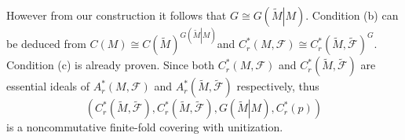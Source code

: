 \documentclass{beamer}
\theoremstyle{plain}
\newcommand{\sF}{\mathcal{F}}       %
\begin{document}
\begin{frame}
	However from our construction it follows that $G \cong G\left(\left.\widetilde M\right| M\right)$.
Condition (b) can be deduced from $C\left(M\right)\cong C\left(\widetilde M\right)^{G\left(\left.\widetilde M\right| M\right)}$and $C^*_r\left( M, {\sF}\right) \cong C^*_r \left(\widetilde M, \widetilde{\sF}\right)^G$. Condition (c) is already proven. Since both $C^*_r\left( M, {\sF}\right)$  and $C^*_r \left(\widetilde M, \widetilde{\sF}\right)$ are essential ideals of $A^*_r\left( M, {\sF}\right)$  and $A^*_r \left(\widetilde M, \widetilde{\sF}\right)$ respectively, thus $$
\left(C^*_r \left(\widetilde M, \widetilde{\sF}\right), C^*_r \left(\widetilde M, \widetilde{\sF}\right), G\left(\left.\widetilde M\right| M\right), C^*_r\left(p \right) \right)
$$
is a noncommutative finite-fold covering with unitization.

\end{frame}
\end{document}
